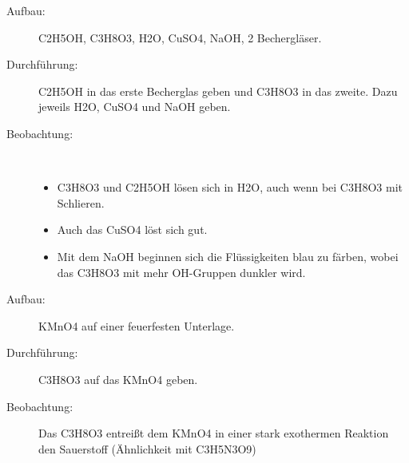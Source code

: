 \begin{description}
	\item[Aufbau:] \ac{C2H5OH}, \ac{C3H8O3}, \ac{H2O}, \ac{CuSO4}, \ac{NaOH},
		2 Bechergläser.
	\item[Durchführung:] \ac{C2H5OH} in das erste Becherglas geben und \ac{C3H8O3} in
		das zweite. Dazu jeweils \ac{H2O}, \ac{CuSO4} und \ac{NaOH} geben.
	\item[Beobachtung:]~
	\begin{itemize}
		\item \ac{C3H8O3} und \ac{C2H5OH} lösen sich in \ac{H2O},
			auch wenn bei \ac{C3H8O3} mit Schlieren.
		\item Auch das \ac{CuSO4} löst sich gut.
		\item Mit dem \ac{NaOH} beginnen sich die Flüssigkeiten blau zu färben,
			wobei das \ac{C3H8O3} mit mehr OH-Gruppen dunkler wird.
	\end{itemize}
\end{description}

\begin{description}
	\item[Aufbau:] \ac{KMnO4} auf einer feuerfesten Unterlage.
	\item[Durchführung:] \ac{C3H8O3} auf das \ac{KMnO4} geben.
	\item[Beobachtung:] Das \ac{C3H8O3} entreißt dem \ac{KMnO4} in einer stark
		exothermen Reaktion den Sauerstoff (Ähnlichkeit mit \ac{C3H5N3O9})
\end{description}

